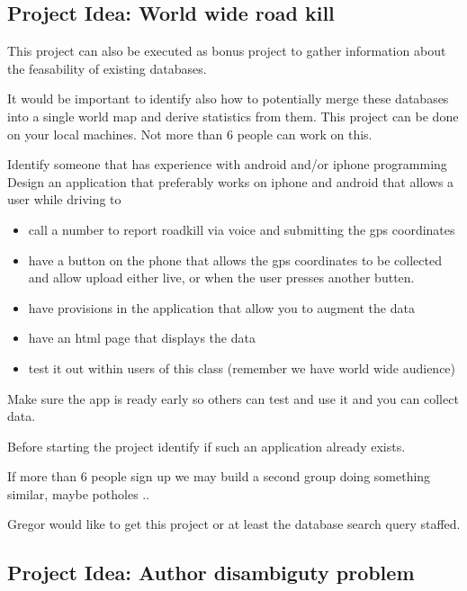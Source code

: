 \subsection{Project Idea: World wide road
kill}\label{project-idea-world-wide-road-kill}

This project can also be executed as bonus project to gather information
about the feasability of existing databases.

It would be important to identify also how to potentially merge these
databases into a single world map and derive statistics from them. This
project can be done on your local machines. Not more than 6 people can
work on this.

Identify someone that has experience with android and/or iphone
programming Design an application that preferably works on iphone and
android that allows a user while driving to

\begin{itemize}

\item
  call a number to report roadkill via voice and submitting the gps
  coordinates
\item
  have a button on the phone that allows the gps coordinates to be
  collected and allow upload either live, or when the user presses
  another butten.
\item
  have provisions in the application that allow you to augment the data
\item
  have an html page that displays the data
\item
  test it out within users of this class (remember we have world wide
  audience)
\end{itemize}

Make sure the app is ready early so others can test and use it and you
can collect data.

Before starting the project identify if such an application already
exists.

If more than 6 people sign up we may build a second group doing
something similar, maybe potholes ..

Gregor would like to get this project or at least the database search
query staffed.

\subsection{Project Idea: Author disambiguty
problem}\label{project-idea-author-disambiguty-problem}

